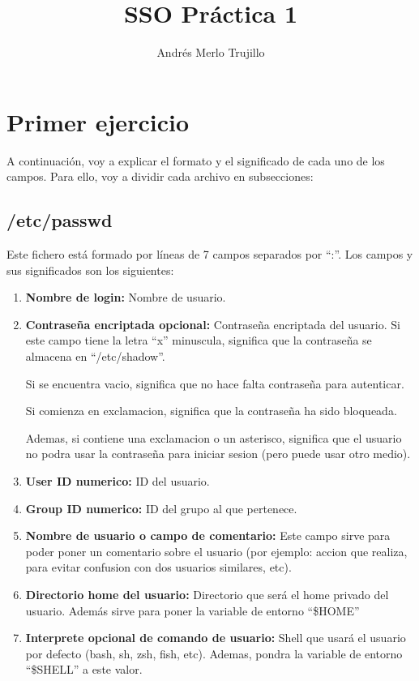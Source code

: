 \documentclass{article}
\title{SSO Práctica 1}
\author{Andrés Merlo Trujillo}
\date{}
\begin{document}
\maketitle

\tableofcontents

\section{Primer ejercicio}
A continuación, voy a explicar el formato y el significado de cada uno de los campos. Para ello, voy a dividir cada archivo en subsecciones:

\subsection{/etc/passwd}
Este fichero está formado por líneas de 7 campos separados por ``:''. Los campos y sus significados son los siguientes:

\begin{enumerate}
    \item \textbf{Nombre de login: }Nombre de usuario.
    \item \textbf{Contraseña encriptada opcional: }Contraseña encriptada del usuario.
    Si este campo tiene la letra ``x'' minuscula, significa que la contraseña se almacena en ``/etc/shadow''.

    Si se encuentra vacio, significa que no hace falta contraseña para autenticar.

    Si comienza en exclamacion, significa que la contraseña ha sido bloqueada.

    Ademas, si contiene una exclamacion o un asterisco, significa que el usuario no podra usar la contraseña para iniciar sesion (pero puede usar otro medio).

    \item \textbf{User ID numerico: }ID del usuario.
    \item \textbf{Group ID numerico: }ID del grupo al que pertenece.
    \item \textbf{Nombre de usuario o campo de comentario: }Este campo sirve para poder poner un comentario sobre el usuario (por ejemplo: accion que realiza, para evitar confusion con dos usuarios similares, etc).
    \item \textbf{Directorio home del usuario: }Directorio que será el home privado del usuario. Además sirve para poner la variable de entorno ``\$HOME''
    \item \textbf{Interprete opcional de comando de usuario: }Shell que usará el usuario por defecto (bash, sh, zsh, fish, etc). Ademas, pondra la variable de entorno ``\$SHELL'' a este valor.
\end{enumerate}
\end{document}
